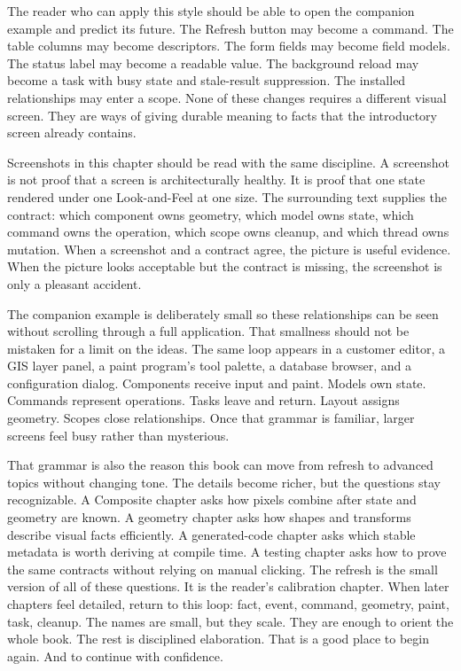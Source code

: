 The reader who can apply this style should be able to open the companion
example and predict its future. The Refresh button may become a command. The
table columns may become descriptors. The form fields may become field models.
The status label may become a readable value. The background reload may become a
task with busy state and stale-result suppression. The installed relationships
may enter a scope. None of these changes requires a different visual screen.
They are ways of giving durable meaning to facts that the introductory screen
already contains.

Screenshots in this chapter should be read with the same discipline. A
screenshot is not proof that a screen is architecturally healthy. It is proof
that one state rendered under one Look-and-Feel at one size. The surrounding
text supplies the contract: which component owns geometry, which model owns
state, which command owns the operation, which scope owns cleanup, and which
thread owns mutation. When a screenshot and a contract agree, the picture is
useful evidence. When the picture looks acceptable but the contract is missing,
the screenshot is only a pleasant accident.

The companion example is deliberately small so these relationships can be seen
without scrolling through a full application. That smallness should not be
mistaken for a limit on the ideas. The same loop appears in a customer editor, a
GIS layer panel, a paint program's tool palette, a database browser, and a
configuration dialog. Components receive input and paint. Models own state.
Commands represent operations. Tasks leave and return. Layout assigns geometry.
Scopes close relationships. Once that grammar is familiar, larger screens feel
busy rather than mysterious.

That grammar is also the reason this book can move from refresh to advanced
topics without changing tone. The details become richer, but the questions stay
recognizable. A Composite chapter asks how pixels combine after state and
geometry are known. A geometry chapter asks how shapes and transforms describe
visual facts efficiently. A generated-code chapter asks which stable metadata is
worth deriving at compile time. A testing chapter asks how to prove the same
contracts without relying on manual clicking. The refresh is the small version
of all of these questions.
It is the reader's calibration chapter.
When later chapters feel detailed, return to this loop: fact, event, command,
geometry, paint, task, cleanup. The names are small, but they scale.
They are enough to orient the whole book.
The rest is disciplined elaboration.
That is a good place to begin again.
And to continue with confidence.

